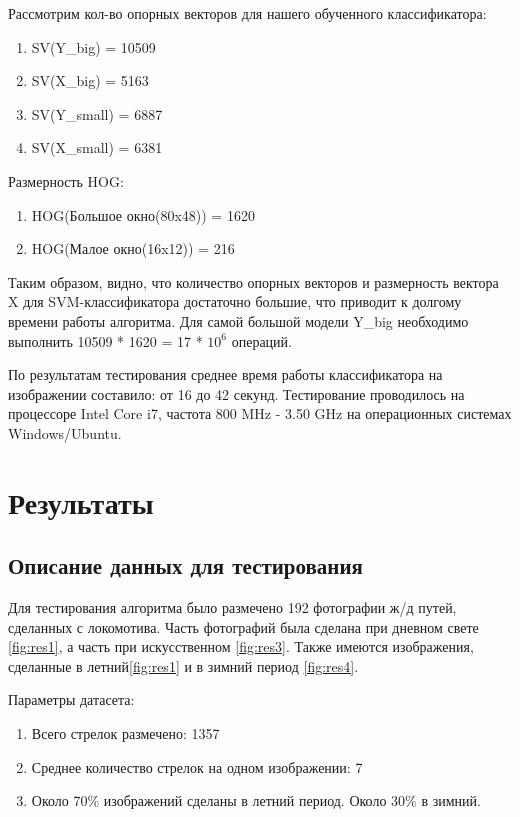 Рассмотрим кол-во опорных векторов для нашего обученного классификатора:
\begin{enumerate}
	\item SV(Y\_big) = 10509
	\item SV(X\_big) = 5163
	\item SV(Y\_small) = 6887
	\item SV(X\_small) = 6381
\end{enumerate}

Размерность HOG:
\begin{enumerate}
	\item HOG(Большое окно(80x48)) = 1620
	\item HOG(Малое окно(16x12)) = 216
\end{enumerate}

Таким образом, видно, что количество опорных векторов и размерность вектора X для SVM-классификатора достаточно большие, что приводит к долгому времени работы алгоритма.
Для самой большой модели Y\_big необходимо выполнить 10509 * 1620 = 17 * $10^6$ операций.

По результатам тестирования среднее время работы классификатора на изображении составило: от 16 до 42 секунд. Тестирование проводилось на процессоре Intel Core i7, частота 800 MHz - 3.50 GHz на операционных системах Windows/Ubuntu.

\newpage
\chapter{Результаты}

\section{Описание данных для тестирования}
Для тестирования алгоритма было размечено 192 фотографии ж/д путей, сделанных с локомотива. Часть фотографий была сделана при дневном свете \ref{fig:res1}, а часть при искусственном \ref{fig:res3}. Также имеются изображения, сделанные в летний\ref{fig:res1} и в зимний период \ref{fig:res4}.

Параметры датасета:
\begin{enumerate}
	\item Всего стрелок размечено: 1357
	\item Среднее количество стрелок на одном изображении: 7
	\item Около 70\% изображений сделаны в летний период. Около 30\% в зимний.
\end{enumerate}

